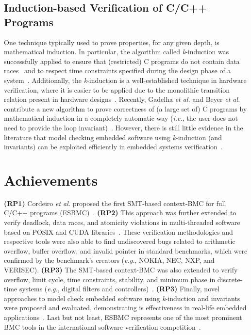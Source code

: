 \documentclass{acm_sen_article}
\begin{document}
\subsection{Induction-based Verification of C/C++ Programs}

One technique typically used to prove properties, for any given depth, is mathematical induction. In particular, the algorithm called \textit{k}-induction was successfully applied to ensure that (restricted) C programs do not contain data races~\cite{Donaldson10,Kinductor} and to respect time constraints specified during the design phase of a system~\cite{EenS03}. Additionally, the \textit{k}-induction is a well-established technique in hardware verification, where it is easier to be applied due to the monolithic transition relation present 
in hardware designs~\cite{EenS03,GrosseLD09,Sheera00}. Recently, Gadelha {\it et al.} and Beyer {\it et al.} contribute a new algorithm to prove correctness of (a large set of) C programs by mathematical induction in a completely automatic way ({\it i.e.}, the user does not need to provide the loop invariant)~\cite{Gadelha15,Beyer15}. However, there is still little evidence in the literature that model checking embedded software using \textit{k}-induction (and invariants) can be exploited efficiently in embedded systems verification~\cite{Rocha15}.


\section{Achievements}
\label{achievements}

\textbf{(RP1)} Cordeiro {\it et al.} proposed the first SMT-based context-BMC for full C/C++ programs (ESBMC)~\cite{Cordeiro12,ECBS13}. \textbf{(RP2)} This approach was further extended to verify deadlock, data races, and atomicity violations in multi-threaded software based on POSIX and CUDA libraries~\cite{CordeiroF11,Pereira15}. These verification methodologies and respective tools were also able to find undiscovered bugs related to arithmetic overflow, buffer overflow, and invalid pointer in standard benchmarks, which were confirmed by the benchmark’s creators ({\it e.g.}, NOKIA, NEC, NXP, and VERISEC). \textbf{(RP3)} The SMT-based context-BMC was also extended to verify overflow, limit cycle, time constraints, stability, and minimum phase in discrete-time systems ({\it e.g.}, digital filters and controllers)~\cite{esbmc_controller,dsv_spin2015,esbmc_filter}. \textbf{(RP3)} Finally, novel approaches to model check embedded software using \textit{k}-induction and invariants were proposed and evaluated, demonstrating is effectiveness in real-life embedded applications~\cite{Gadelha15,Rocha15}. Last but not least, ESBMC represents one of the most prominent BMC tools in the international software verification competition~\cite{MorseCNF13,MorseRCN014}.
\end{document}
